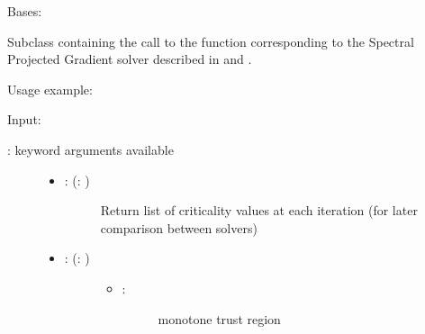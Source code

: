 \documentclass[a4paper,10pt,english]{sphinxmanual}
\begin{document}

\begin{fulllineitems}
\label{\detokenize{skprocrustes:skprocrustes.SPGSolver}}
Bases: 

Subclass containing the call to the  function 
corresponding to the Spectral Projected Gradient solver described in 
{\hyperref[\detokenize{index:bibliography}]{}} and {\hyperref[\detokenize{index:bibliography}]{}}.

Usage example:

\begin{sphinxVerbatim}[commandchars=\\\{\}]
  
  
\end{sphinxVerbatim}

Input:
\begin{description}
\item[{: keyword arguments available}] \leavevmode\begin{itemize}
\item {} \begin{description}
\item[{: (: )}] \leavevmode
Return list of criticality values at each iteration (for later
comparison between solvers)

\end{description}

\item {} \begin{description}
\item[{: (: )}] \leavevmode\begin{itemize}
\item {} \begin{description}
\item[{: }] \leavevmode
monotone trust region


\end{description}
\end{itemize}
\end{description}
\end{itemize}
\end{description}
\end{fulllineitems}
\end{document}
